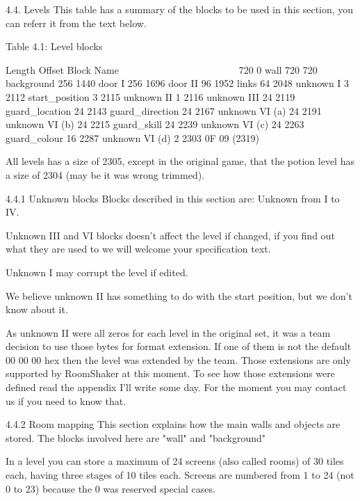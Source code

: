 4.4. Levels
 This table has a summary of the blocks to be used in this section,
 you can referr it from the text below.

                   Table 4.1: Level blocks
                   ~~~~~~~~~~~~~~~~~~~~~~~

  Length Offset  Block Name
  ~~~~~~ ~~~~~~  ~~~~~~~~~~
  720    0       wall
  720    720     background
  256    1440    door I
  256    1696    door II
  96     1952    links
  64     2048    unknown I
  3      2112    start_position
  3      2115    unknown II
  1      2116    unknown III
  24     2119    guard_location
  24     2143    guard_direction
  24     2167    unknown VI (a)
  24     2191    unknown VI (b)
  24     2215    guard_skill
  24     2239    unknown VI (c)
  24     2263    guard_colour
  16     2287    unknown VI (d)
  2      2303    0F 09 (2319)

 All levels has a size of 2305, except in the original game, that the
 potion level has a size of 2304 (may be it was wrong trimmed).

4.4.1 Unknown blocks
 Blocks described in this section are: Unknown from I to IV.

 Unknown III and VI blocks doesn't affect the level if changed, if you find
 out what they are used to we will welcome your specification text.

 Unknown I may corrupt the level if edited.

 We believe unknown II has something to do with the start position, but we
 don't know about it.

 As unknown II were all zeros for each level in the original set, it was a
 team decision to use those bytes for format extension. If one of them is
 not the default 00 00 00 hex then the level was extended by the team.
 Those extensions are only supported by RoomShaker at this  moment. To see
 how those extensions were defined read the appendix I'll write some day.
 For the moment you may contact us if you need to know that.

4.4.2 Room mapping
 This section explains how the main walls and objects are stored. The
 blocks involved here are "wall" and "background"

 In a level you can store a maximum of 24 screens (also called rooms) of 30
 tiles each, having three stages of 10 tiles each. Screens are numbered
 from 1 to 24 (not 0 to 23) because the 0 was reserved special cases.

